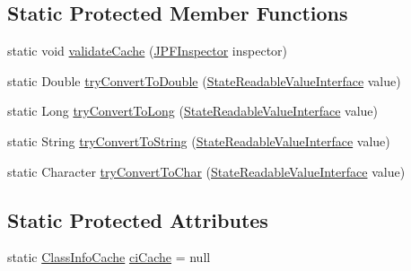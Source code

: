 \subsection*{Static Protected Member Functions}
\begin{DoxyCompactItemize}
\item 
static void \hyperlink{classgov_1_1nasa_1_1jpf_1_1inspector_1_1server_1_1programstate_1_1relop_1_1_rel_op_comparable_base_a7e8b465bb4002c1759b6096f9e2eecbf}{validate\+Cache} (\hyperlink{classgov_1_1nasa_1_1jpf_1_1inspector_1_1server_1_1jpf_1_1_j_p_f_inspector}{J\+P\+F\+Inspector} inspector)
\item 
static Double \hyperlink{classgov_1_1nasa_1_1jpf_1_1inspector_1_1server_1_1programstate_1_1relop_1_1_rel_op_comparable_base_afb31d12a03d2e24581d168c765368a4b}{try\+Convert\+To\+Double} (\hyperlink{interfacegov_1_1nasa_1_1jpf_1_1inspector_1_1server_1_1programstate_1_1_state_readable_value_interface}{State\+Readable\+Value\+Interface} value)
\item 
static Long \hyperlink{classgov_1_1nasa_1_1jpf_1_1inspector_1_1server_1_1programstate_1_1relop_1_1_rel_op_comparable_base_a42b354e4aa57e673f728b1c2c036c69b}{try\+Convert\+To\+Long} (\hyperlink{interfacegov_1_1nasa_1_1jpf_1_1inspector_1_1server_1_1programstate_1_1_state_readable_value_interface}{State\+Readable\+Value\+Interface} value)
\item 
static String \hyperlink{classgov_1_1nasa_1_1jpf_1_1inspector_1_1server_1_1programstate_1_1relop_1_1_rel_op_comparable_base_aa1b564784dad5abf5565f080fe1a3a9f}{try\+Convert\+To\+String} (\hyperlink{interfacegov_1_1nasa_1_1jpf_1_1inspector_1_1server_1_1programstate_1_1_state_readable_value_interface}{State\+Readable\+Value\+Interface} value)
\item 
static Character \hyperlink{classgov_1_1nasa_1_1jpf_1_1inspector_1_1server_1_1programstate_1_1relop_1_1_rel_op_comparable_base_a1e3bca3adb8c3a790eaad60d9adf5c47}{try\+Convert\+To\+Char} (\hyperlink{interfacegov_1_1nasa_1_1jpf_1_1inspector_1_1server_1_1programstate_1_1_state_readable_value_interface}{State\+Readable\+Value\+Interface} value)
\end{DoxyCompactItemize}
\subsection*{Static Protected Attributes}
\begin{DoxyCompactItemize}
\item 
static \hyperlink{classgov_1_1nasa_1_1jpf_1_1inspector_1_1utils_1_1_class_info_cache}{Class\+Info\+Cache} \hyperlink{classgov_1_1nasa_1_1jpf_1_1inspector_1_1server_1_1programstate_1_1relop_1_1_rel_op_comparable_base_a3bd22b88a44dff54d68b1d8a3e8f3d0a}{ci\+Cache} = null
\end{DoxyCompactItemize}



